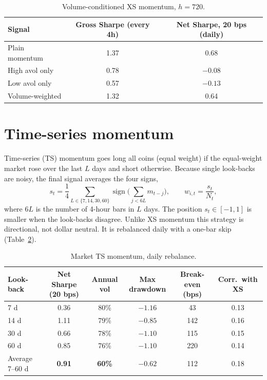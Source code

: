 \documentclass[aps,prl,onecolumn,superscriptaddress,nofootinbib]{revtex4-2}
\begin{document}
	\begin{table}[h]
		\caption{Volume-conditioned XS momentum, $h = 720$.}
		\label{tab:volume}
		\begin{ruledtabular}
			\begin{tabular}{lcc}
				Signal & Gross Sharpe (every 4h) & Net Sharpe, 20 bps (daily) \\
				\hline
				Plain momentum   & 1.37 & 0.68 \\
				High avol only   & 0.78 & $-0.08$ \\
				Low avol only    & 0.57 & $-0.13$ \\
				Volume-weighted  & 1.32 & 0.64 \\
			\end{tabular}
		\end{ruledtabular}
	\end{table}
	
	\section{Time-series momentum}
	\label{app:ts}
	
	Time-series (TS) momentum goes long all coins (equal weight) if the equal-weight market rose over the last $L$ days and short otherwise. Because single look-backs are noisy, the final signal averages the four signs,
	\begin{equation}
		s_t = \frac14 \sum_{L \in \{7,14,30,60\}} \operatorname{sign}\!\Big(\sum_{j<6L} m_{t-j}\Big), \qquad
		w_{i,t} = \frac{s_t}{N_t},
		\label{eq:ts}
	\end{equation}
	where $6L$ is the number of 4-hour bars in $L$ days. The position $s_t \in [-1, 1]$ is smaller when the look-backs disagree. Unlike XS momentum this strategy is directional, not dollar neutral. It is rebalanced daily with a one-bar skip (Table~\ref{tab:ts}).
	
	\begin{table}[h]
		\caption{Market TS momentum, daily rebalance.}
		\label{tab:ts}
		\begin{ruledtabular}
			\begin{tabular}{lccccc}
				Look-back & Net Sharpe (20 bps) & Annual vol & Max drawdown & Break-even (bps) & Corr.\ with XS \\
				\hline
				7 d   & 0.36 & 80\% & $-1.16$ & 43  & 0.13 \\
				14 d  & 1.11 & 79\% & $-0.85$ & 142 & 0.16 \\
				30 d  & 0.66 & 78\% & $-1.10$ & 115 & 0.15 \\
				60 d  & 0.85 & 76\% & $-1.10$ & 220 & 0.14 \\
				Average 7--60 d & \textbf{0.91} & \textbf{60\%} & $\mathbf{-0.62}$ & 112 & 0.18 \\
			\end{tabular}
		\end{ruledtabular}
	\end{table}
	
\end{document}

